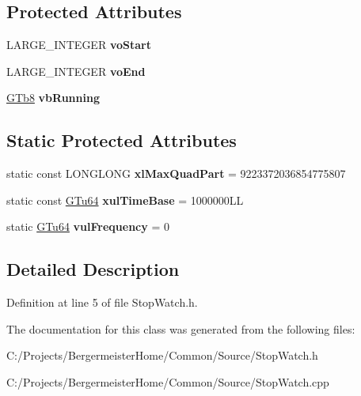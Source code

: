 \subsection*{Protected Attributes}
\begin{DoxyCompactItemize}
\item 
\mbox{\label{class_g_n_common_1_1_g_tc_stop_watch_a48e00f31a5f0d2ec9bf4678e3ea8bc0a}} 
L\+A\+R\+G\+E\+\_\+\+I\+N\+T\+E\+G\+ER {\bfseries vo\+Start}
\item 
\mbox{\label{class_g_n_common_1_1_g_tc_stop_watch_a0c7c046a1a57282bf389af72252410f6}} 
L\+A\+R\+G\+E\+\_\+\+I\+N\+T\+E\+G\+ER {\bfseries vo\+End}
\item 
\mbox{\label{class_g_n_common_1_1_g_tc_stop_watch_a8b50e42107f8f88743eea8856fe85dd5}} 
\mbox{\hyperlink{namespace_g_n_common_a6b5283329f609e2175dd0c91fc1520ba}{G\+Tb8}} {\bfseries vb\+Running}
\end{DoxyCompactItemize}
\subsection*{Static Protected Attributes}
\begin{DoxyCompactItemize}
\item 
\mbox{\label{class_g_n_common_1_1_g_tc_stop_watch_ae1b92efd901fed6c6de030fc9112a15f}} 
static const L\+O\+N\+G\+L\+O\+NG {\bfseries xl\+Max\+Quad\+Part} = 9223372036854775807
\item 
\mbox{\label{class_g_n_common_1_1_g_tc_stop_watch_ac9ff802e3258165d18f566ffe6bd6fc1}} 
static const \mbox{\hyperlink{namespace_g_n_common_a01e8527dabf7ab4f123156b0701945eb}{G\+Tu64}} {\bfseries xul\+Time\+Base} = 1000000\+LL
\item 
\mbox{\label{class_g_n_common_1_1_g_tc_stop_watch_afd7212375fb1201a16f966430dfcc30d}} 
static \mbox{\hyperlink{namespace_g_n_common_a01e8527dabf7ab4f123156b0701945eb}{G\+Tu64}} {\bfseries vul\+Frequency} = 0
\end{DoxyCompactItemize}


\subsection{Detailed Description}


Definition at line 5 of file Stop\+Watch.\+h.



The documentation for this class was generated from the following files\+:\begin{DoxyCompactItemize}
\item 
C\+:/\+Projects/\+Bergermeister\+Home/\+Common/\+Source/Stop\+Watch.\+h\item 
C\+:/\+Projects/\+Bergermeister\+Home/\+Common/\+Source/Stop\+Watch.\+cpp\end{DoxyCompactItemize}
